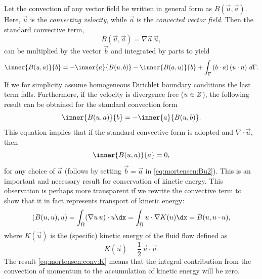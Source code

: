 Let the convection of any vector field be written in general form as
$B(\vec{u},\vec{a})$. Here, $\vec{u}$ is the \emph{convecting velocity},
while $\vec{a}$ is the \emph{convected vector field}. Then the standard
convective term,
\begin{equation}
B(\vec{u},\vec{a}) =  \nabla \vec{a} \, \vec{u},
\end{equation}
can be multiplied by the vector $\vec{b}$ and integrated by parts to yield
\begin{equation}
 \inner{ B(\vec{u}, \vec{a})}{\vec{b}} = -\inner{\vec{a}}{B(\vec{u},\vec{b})} - \inner{B (\vec{a}, \vec{u})}{\vec{b} } + \int_{\Gamma} \left(\vec{b} \cdot \vec{a} \right)\left(\vec{u} \cdot \vec{n} \right) \, d\Gamma.
\label{eq:mortensen:Bu1}
\end{equation}
If we for simplicity assume homogeneous Dirichlet boundary conditions
the last term falls. Furthermore, if the velocity is divergence free
(${u}\in Z$), the following result can be obtained for the
standard convection form
\begin{equation}
  \inner{ B(\vec{u},\vec{a})}{\vec{b} } = -\inner{ \vec{a}}{ B(\vec{u},\vec{b}) }.
\label{eq:mortensen:Bu2}
\end{equation}
This equation implies that if the standard convective form is adopted
and $\nabla\cdot\vec{u}$, then
\begin{equation}
\inner{ B(\vec{u}, \vec{a})}{ \vec{a} } = 0,
\label{eq:mortensen:B0}
\end{equation}
for any choice of $\vec{a}$ (follows by setting $\vec{b}=\vec{a}$ in
\eqref{eq:mortensen:Bu2}). This is an important and necessary result
for conservation of kinetic energy. This observation is perhaps more
transparent if we rewrite the convective term to show that it in fact
represents transport of kinetic energy:
\begin{equation}
\label{eq:mortensen:conv:K}
\left(B(\vec{u}, \vec{u}), \vec{u} \right)
= \int_\Omega (\nabla\vec{u} \, \vec{u})\cdot\vec{u}\dx
= \int_\Omega \vec{u}\cdot\nabla K(\vec{u})\dx
= B(\vec{u}, \vec{u}\cdot\vec{u}),
\end{equation}
where $K(\vec{u})$ is the (specific) kinetic energy of the fluid flow
defined as
\begin{equation}
 K(\vec{u})=\frac{1}{2}\, \vec{u}\cdot \vec{u}. \label{eq:mortensen:K}
\end{equation}
The result \eqref{eq:mortensen:conv:K} means that the integral
contribution from the convection of momentum to the accumulation of
kinetic energy will be zero.

